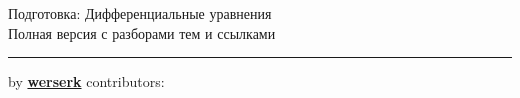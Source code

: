 \documentclass[11pt,a4paper]{article}
\newcommand{\topicsBase}{cheatsheets/math/differential-equations/preparation/topics}
\begin{document}
\begin{center}
  {\Huge Подготовка: Дифференциальные уравнения}\\[0.4cm]
  {\large Полная версия с разборами тем и ссылками}\\[0.2cm]
  \rule{\textwidth}{0.6pt}
\end{center}



% 
% 

\providecommand{\contributors}{}

{\noindent by \href{https://werserk.com}{\textcolor{accent}{\textbf{werserk}}} \hfill contributors: \texttt{\contributors}}
\end{document}
